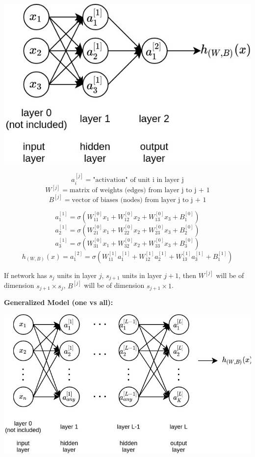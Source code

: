 \documentclass{article}
\begin{document}
\begin{center}
\includegraphics[scale=0.4]{./images/neural_network.jpg}
\end{center}
\[a_i^{[j]} = \text{"activation" of unit i in layer j}\]
\[W^{[j]} = \text{matrix of weights (edges) from layer j to j + 1}\]
\[B^{[j]} = \text{vector of biases (nodes) from layer j to j + 1}\]

\[a_1^{[1]} = \sigma(W_{11}^{[0]} x_1 + W_{12}^{[0]} x_2 + W_{13}^{[0]} x_3 + B_{1}^{[0]})\]
\[a_2^{[1]} = \sigma(W_{21}^{[0]} x_1 + W_{22}^{[0]} x_2 + W_{23}^{[0]} x_3 + B_{2}^{[0]})\]
\[a_3^{[1]} = \sigma(W_{31}^{[0]} x_1 + W_{32}^{[0]} x_2 + W_{33}^{[0]} x_3 + B_{3}^{[0]})\]
\[h_{(W, B)}(x) = a_1^{[2]} = \sigma(W_{11}^{[1]} a_1^{[1]} + W_{12}^{[1]} a_2^{[1]} + W_{13}^{[1]} a_3^{[1]} + B_{1}^{[1]})\]

\bigskip

\noindent If network has \(s_j\) units in layer \(j\), \(s_{j + 1}\) units in layer \(j + 1\), then \(W^{[j]}\) will be of dimension \(s_{j + 1} \times s_j\), \(B^{[j]}\) will be of dimension \(s_{j + 1} \times 1\).

\bigskip

\noindent \textbf{Generalized Model (one vs all):}

\begin{center}
\includegraphics[scale=0.4]{./images/neural_network_generalized.jpg}
\end{center}
\end{document}
